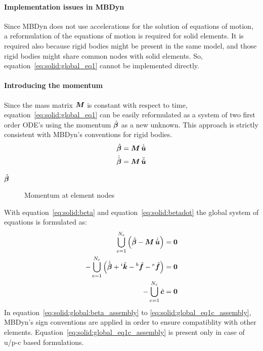 \paragraph{Implementation issues in MBDyn}
Since MBDyn does not use accelerations for the solution of equations of motion, a reformulation of the equations of motion is required for solid elements.
It is required also because rigid bodies might be present in the same model, and those rigid bodies might share common nodes with solid elements.
So, equation~\ref{eq:solid:global_eq1} cannot be implemented directly.

\paragraph{Introducing the momentum}
Since the mass matrix $\bm{M}$ is constant with respect to time,
equation~\ref{eq:solid:global_eq1} can be easily reformulated as a system of two first order ODE's
using the momentum $\hat{\bm{\beta}}$ as a new unknown.
This approach is strictly consistent with MBDyn's conventions for rigid bodies.
\begin{eqnarray}
\hat{\bm{\beta}}=\bm{M}\,\dot{\hat{\bm{u}}} \label{eq:solid:beta} \\
\dot{\hat{\bm{\beta}}}=\bm{M}\,\ddot{\hat{\bm{u}}} \label{eq:solid:betadot}
\end{eqnarray}

\begin{description}
\item[$\hat{\bm{\beta}}$] Momentum at element nodes
\end{description}

With equation~\ref{eq:solid:beta} and equation~\ref{eq:solid:betadot} the global system of equations is formulated as:
\begin{eqnarray}
\bigcup_{e=1}^{N_e} \left(\hat{\bm{\beta}} - \bm{M} \, \dot{\hat{\bm{u}}}\right) = \bm{0} \label{eq:solid:global:beta_assembly} \\
-\bigcup_{e=1}^{N_e} \left(\dot{\hat{\bm{\beta}}} + {^i}\hat{\bm{k}} - {^b}\hat{\bm{f}} - {^e}\hat{\bm{f}}\right) = \bm{0} \label{eq:solid:global:betadot_assembly} \\
-\bigcup_{e=1}^{N_e} \hat{\bm{c}} = \bm{0} \label{eq:solid:global_eq1c_assembly}
\end{eqnarray}
In equation~\ref{eq:solid:global:beta_assembly} to \ref{eq:solid:global_eq1c_assembly},
MBDyn's sign conventions are applied in order to ensure compatiblity with other elements.
Equation~\ref{eq:solid:global_eq1c_assembly} is present only in case of u/p-c based formulations.

